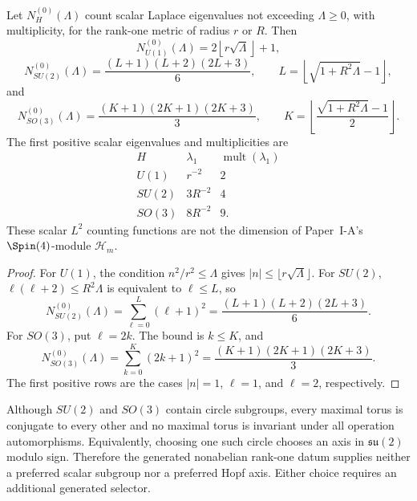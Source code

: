 \documentclass[11pt,a4paper]{article}
\begin{document}
\begin{corollary}
\label{p2:cor:rank-one-scalar-spectral-counting}
Let \(N_H^{(0)}(\Lambda)\) count scalar Laplace eigenvalues not exceeding
\(\Lambda\ge0\), with multiplicity, for the rank-one metric of radius \(r\)
or \(R\).  Then
\[
 N_{U(1)}^{(0)}(\Lambda)
 =2\left\lfloor r\sqrt{\Lambda}\right\rfloor+1,
\]
\[
 N_{SU(2)}^{(0)}(\Lambda)
 =\frac{(L+1)(L+2)(2L+3)}6,
 \qquad
 L=\left\lfloor\sqrt{1+R^2\Lambda}-1\right\rfloor,
\]
and
\[
 N_{SO(3)}^{(0)}(\Lambda)
 =\frac{(K+1)(2K+1)(2K+3)}3,
 \qquad
 K=\left\lfloor
 \frac{\sqrt{1+R^2\Lambda}-1}{2}
 \right\rfloor.
\]
The first positive scalar eigenvalues and multiplicities are
\[
\begin{array}{c|c|c}
H&\lambda_1&\operatorname{mult}(\lambda_1)\\ \hline
U(1)&r^{-2}&2\\
SU(2)&3R^{-2}&4\\
SO(3)&8R^{-2}&9.
\end{array}
\]
These scalar \(L^2\) counting functions are not the dimension of Paper~I-A's
\(\Spin(4)\)-module \(\mathcal H_m\).
\end{corollary}

\begin{proof}
For \(U(1)\), the condition \(n^2/r^2\le\Lambda\) gives
\(|n|\le\lfloor r\sqrt\Lambda\rfloor\).  For \(SU(2)\),
\(\ell(\ell+2)\le R^2\Lambda\) is equivalent to
\(\ell\le L\), so
\[
 N_{SU(2)}^{(0)}(\Lambda)
 =\sum_{\ell=0}^{L}(\ell+1)^2
 =\frac{(L+1)(L+2)(2L+3)}6.
\]
For \(SO(3)\), put \(\ell=2k\).  The bound is \(k\le K\), and
\[
 N_{SO(3)}^{(0)}(\Lambda)
 =\sum_{k=0}^{K}(2k+1)^2
 =\frac{(K+1)(2K+1)(2K+3)}3.
\]
The first positive rows are the cases
\(|n|=1\), \(\ell=1\), and \(\ell=2\), respectively.
\end{proof}

\begin{theorem}
\label{p2:thm:no-canonical-maximal-torus}
Although \(SU(2)\) and \(SO(3)\) contain circle subgroups, every maximal torus
is conjugate to every other and no maximal torus is invariant under all
operation automorphisms.  Equivalently, choosing one such circle chooses an
axis in \(\mathfrak{su}(2)\) modulo sign.  Therefore the generated
nonabelian rank-one datum supplies neither a preferred scalar subgroup nor a
preferred Hopf axis.  Either choice requires an additional generated
selector.
\end{theorem}
\end{document}
